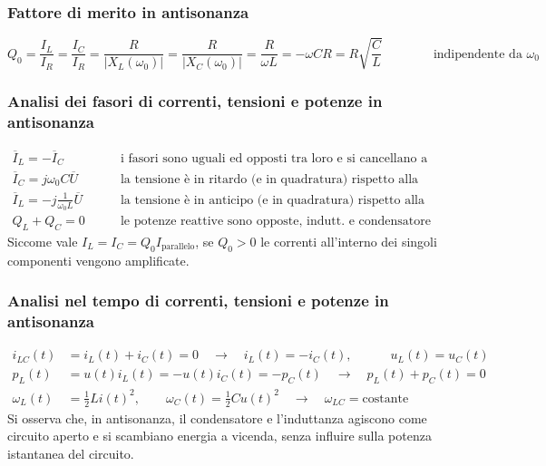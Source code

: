 \documentclass[a4paper]{article}
\begin{document}
\subsubsection*{Fattore di merito in antisonanza}
\[Q_0 = \frac{I_L}{I_R} = \frac{I_C}{I_R} = \frac{R}{\left|X_L(\omega_0)\right|} = \frac{R}{\left|X_C(\omega_0)\right|} = \frac{R}{\omega L} = -\omega C R = R \sqrt{\frac{C}{L}} \qquad\qquad \text{indipendente da } \omega_0\]

\subsubsection*{Analisi dei fasori di correnti, tensioni e potenze in antisonanza}
\begin{align*}
	\overline{I}_L = - \overline{I}_C \qquad &\text{i fasori sono uguali ed opposti tra loro e si cancellano a vicenda} \\
	\overline{I}_C = j \omega_0 C \overline{U} \qquad &\text{la tensione è in ritardo (e in quadratura) rispetto alla corrente nel condensatore} \\
	\overline{I}_L = - j \frac{1}{\omega_0 L} \overline{U} \qquad &\text{la tensione è in anticipo (e in quadratura) rispetto alla corrente nell'induttanza} \\
	Q_L + Q_C = 0 \qquad &\text{le potenze reattive sono opposte, indutt. e condensatore formano un circuito aperto}
\end{align*}
Siccome vale \(I_L = I_C = Q_0 I_\text{parallelo}\), se \(Q_0 > 0\) le correnti all'interno dei singoli componenti vengono amplificate.

\subsubsection*{Analisi nel tempo di correnti, tensioni e potenze in antisonanza}
\begin{align*}
	i_{LC}(t) &= i_L(t) + i_C(t) = 0 \quad \rightarrow \quad i_L(t) = - i_C(t), \qquad\quad u_L(t) = u_C(t) \\
	p_L(t) &= u(t) i_L(t) = - u(t) i_C(t) = - p_C(t) \quad \rightarrow \quad p_L(t) + p_C(t) = 0 \\
	\omega_L(t) &= \frac{1}{2} Li(t)^2, \qquad \omega_C(t) = \frac{1}{2} Cu(t)^2 \quad \rightarrow \quad \omega_{LC} = \text{costante}
\end{align*}
Si osserva che, in antisonanza, il condensatore e l'induttanza agiscono come circuito aperto e si scambiano energia a vicenda, senza
influire sulla potenza istantanea del circuito.
\end{document}
